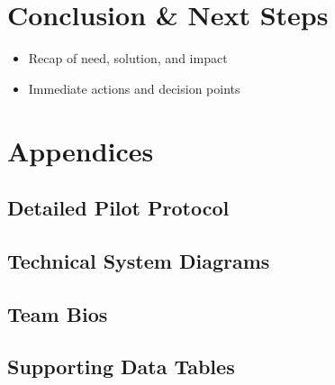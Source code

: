 \documentclass[a4paper,11pt]{article}
\begin{document}
\section{Conclusion \& Next Steps}
\begin{itemize}
  \item Recap of need, solution, and impact
  \item Immediate actions and decision points
\end{itemize}

\newpage


\printbibliography

\appendix
\section{Appendices}
\subsection{Detailed Pilot Protocol}
\subsection{Technical System Diagrams}
\subsection{Team Bios}
\subsection{Supporting Data Tables}
\end{document}
